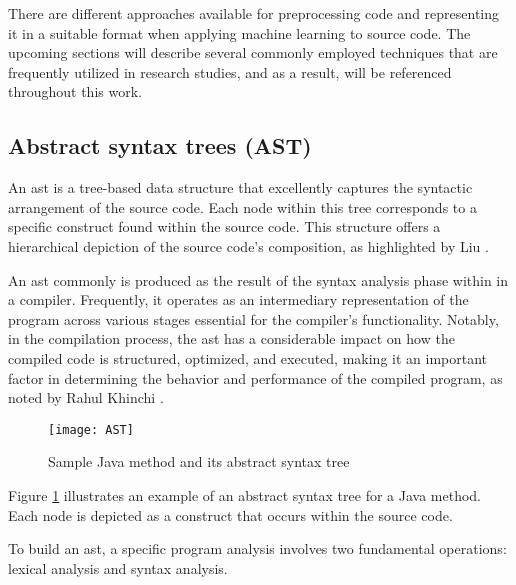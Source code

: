 There are different approaches available for preprocessing code and representing it in a suitable format when applying machine learning to source code. The upcoming sections will describe several commonly employed techniques that are frequently utilized in research studies, and as a result, will be referenced throughout this work.




\subsection{Abstract syntax trees (AST)} %
\label{sec: Abstract_syntax_trees}

An \gls{ast} is a tree-based data structure that excellently captures the syntactic arrangement of the source code. Each node within this tree corresponds to a specific construct found within the source code. This structure offers a hierarchical depiction of the source code's composition, as highlighted by Liu \cite{Kui_Liu2018}.

An \gls{ast} commonly is produced as the result of the syntax analysis phase within in a compiler. Frequently, it operates as an intermediary representation of the program across various stages essential for the compiler's functionality. Notably, in the compilation process, the \gls{ast} has a considerable impact on how the compiled code is structured, optimized, and executed, making it an important factor in determining the behavior and performance of the compiled program, as noted by Rahul Khinchi \cite{rahulkhinchi7}.\\

\begin{figure}[ht]
	\centering
	\texttt{[image: AST]}
	  \caption{Sample Java method and its abstract syntax tree}
  \label{fig:java_ast}
\end{figure}


Figure \ref{fig:java_ast} illustrates an example of an abstract syntax tree for a Java method. Each node is depicted as a construct that occurs within the source code.    


To build an \gls{ast}, a specific program analysis involves two fundamental operations: lexical analysis and syntax analysis.

